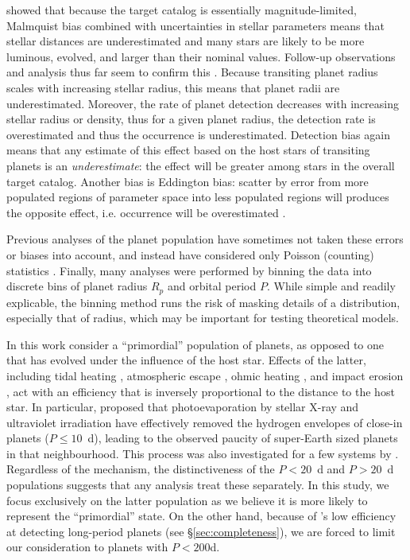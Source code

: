 \citet{GaidosMann2013} showed that because the \kep{} target catalog
is essentially magnitude-limited, Malmquist bias combined with
uncertainties in stellar parameters means that stellar distances are
underestimated and many stars are likely to be more luminous, evolved,
and larger than their nominal values.  Follow-up observations and
analysis thus far seem to confirm this
\citep[e.g.][]{Bastien2014,Everett2013,Verner2011}.  Because
transiting planet radius scales with increasing stellar radius, this means that
planet radii are underestimated.  Moreover, the rate of planet
detection decreases with increasing stellar radius or density, thus
for a given planet radius, the detection rate is overestimated and
thus the occurrence is underestimated.  Detection bias again means
that any estimate of this effect based on the host stars of transiting
planets is an {\it underestimate}: the effect will be greater among
stars in the overall target catalog.  Another bias is Eddington bias:
scatter by error from more populated regions of parameter space into
less populated regions will produces the opposite effect,
i.e. occurrence will be overestimated \citep{GaidosMann2013}.

Previous analyses of the \kep{} planet population have sometimes not taken
these errors or biases into account, and instead have considered only
Poisson (counting) statistics \citep[e.g.][]{Petigura2013,Howard2012}.
Finally, many analyses
were performed by binning the data into discrete bins of planet radius $R_p$
and orbital period $P$.  While simple and readily explicable, the binning
method runs the risk of masking details of a distribution, especially
that of radius, which may be important for testing theoretical
models.

In this work consider a ``primordial'' population of
planets, as opposed to one that has evolved under the influence of the
host star. Effects of the latter, including tidal heating
\citep{Jackson2008}, atmospheric escape \citep{Tian2005}, ohmic heating
\citep{Batygin2011}, and impact erosion \citep{Marcus2009}, act with
an efficiency that is inversely proportional to the distance to the
host star. In particular, \citet{Owen2013} proposed that
photoevaporation by stellar X-ray and ultraviolet irradiation have effectively removed
the hydrogen envelopes of close-in planets ($P \leq 10$~d), leading
to the observed paucity of super-Earth sized planets in that
neighbourhood.  This process was also investigated for a few \kep{}
systems by \citet{Lopez2012}. Regardless of the mechanism, the
distinctiveness of the $P< 20$~d and $P>20$~d populations \citep[see,
e.g.][]{Youdin} suggests that any analysis treat these separately.  In
this study, we focus exclusively on the latter population as we
believe it is more likely to represent the ``primordial'' state.  On
the other hand, because of \kep{}'s low efficiency at detecting
long-period planets (see \S \ref{sec:completeness}), we are forced to
limit our consideration to planets with $P<200$d.

